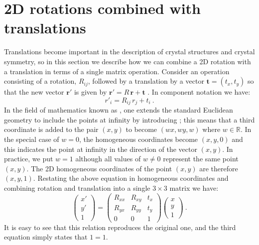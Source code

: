 \section{2D rotations combined with translations}\label{\chabbr:sec:2Darbitrary}
Translations become important in the description of crystal structures and crystal symmetry, so in this section we describe how we can combine a 2D rotation with a translation in terms of a single matrix operation.  Consider an operation consisting of a rotation, $R_{ij}$, followed by a translation by a vector $\mathbf{t}=(t_x,t_y)$ so that the new vector $\mathbf{r}'$ is given by $\mathbf{r}' = R\,\mathbf{r}+\mathbf{t}$ . In component notation we have:
\[
	r'_i = R_{ij}\, r_j + t_i\ .
\]
In the field of mathematics known as , one extends the standard Euclidean geometry to include the points at infinity by introducing ; this means that a third coordinate is added to the pair $(x,y)$ to become $(wx,wy,w)$ where $w\in\mathbb{R}$. In the special case of $w=0$, the homogeneous coordinates become $(x,y,0)$ and this indicates the point at infinity in the direction of the vector $(x,y)$.  In practice, we put $w=1$ although all values of $w\ne0$ represent the same point $(x,y)$.  The 2D homogeneous coordinates of the point $(x,y)$ are therefore $(x,y,1)$.  Restating the above equation in homogeneous coordinates and combining rotation and translation into a single $3\times 3$ matrix we have:
\[
	\begin{pmatrix}x'\\ y'\\ 1\end{pmatrix} = \begin{pmatrix} R_{xx} & R_{xy} & t_x\\ R_{yx} & R_{yy} & t_y\\ 0&0&1\end{pmatrix} \begin{pmatrix}x\\ y\\ 1\end{pmatrix}\ .
\]
It is easy to see that this relation reproduces the original one, and the third equation simply states that $1=1$.  

